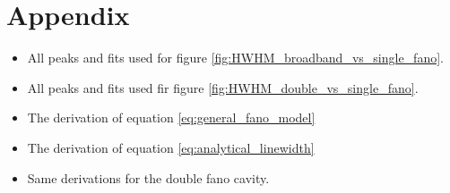 \section{Appendix}

\begin{itemize}
    \item All peaks and fits used for figure \ref{fig:HWHM_broadband_vs_single_fano}.
    \item All peaks and fits used fir figure \ref{fig:HWHM_double_vs_single_fano}.
    \item The derivation of equation \ref{eq:general_fano_model}
    \item The derivation of equation \ref{eq:analytical_linewidth}
    \item Same derivations for the double fano cavity.
\end{itemize}